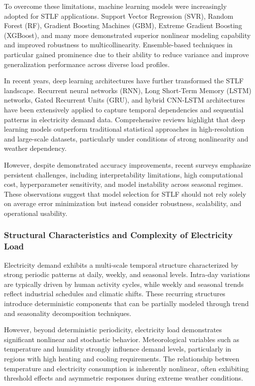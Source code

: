 \documentclass[conference]{IEEEtran}
\begin{document}
To overcome these limitations, machine learning models were increasingly adopted for STLF applications. Support Vector Regression (SVR), Random Forest (RF), Gradient Boosting Machines (GBM), Extreme Gradient Boosting (XGBoost), and many more demonstrated superior nonlinear modeling capability and improved robustness to multicollinearity. Ensemble-based techniques in particular gained prominence due to their ability to reduce variance and improve generalization performance across diverse load profiles\cite{10297192}.

In recent years, deep learning architectures have further transformed the STLF landscape. Recurrent neural networks (RNN), Long Short-Term Memory (LSTM) networks, Gated Recurrent Units (GRU), and hybrid CNN-LSTM architectures have been extensively applied to capture temporal dependencies and sequential patterns in electricity demand data. Comprehensive reviews highlight that deep learning models outperform traditional statistical approaches in high-resolution and large-scale datasets, particularly under conditions of strong nonlinearity and weather dependency.

However, despite demonstrated accuracy improvements, recent surveys emphasize persistent challenges, including interpretability limitations, high computational cost, hyperparameter sensitivity, and model instability across seasonal regimes. These observations suggest that model selection for STLF should not rely solely on average error minimization but instead consider robustness, scalability, and operational usability.

\subsubsection{Structural Characteristics and Complexity of Electricity Load}

Electricity demand exhibits a multi-scale temporal structure characterized by strong periodic patterns at daily, weekly, and seasonal levels. Intra-day variations are typically driven by human activity cycles, while weekly and seasonal trends reflect industrial schedules and climatic shifts. These recurring structures introduce deterministic components that can be partially modeled through trend and seasonality decomposition techniques.

However, beyond deterministic periodicity, electricity load demonstrates significant nonlinear and stochastic behavior. Meteorological variables such as temperature and humidity strongly influence demand levels, particularly in regions with high heating and cooling requirements. The relationship between temperature and electricity consumption is inherently nonlinear, often exhibiting threshold effects and asymmetric responses during extreme weather conditions.
\end{document}
